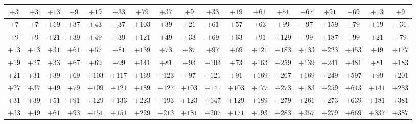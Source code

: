 \documentclass[10pt, portrait,letterpaper]{article}
\begin{document}
{\begin{center}
\begin{tabular}{|c|c|c|c|c|c|c|c|c|c|c|c|c|c|c|c|c|c|}
		\hline
	$+3$ & $+3$ & $+13$ & $+9$ & $+19$ & $+33$ & $+79$ & $+37$ & $+9$ & $+33$ & $+19$ & $+61$ & $+51$ & $+67$ & $+91$ & $+69$ & $+13$ & $+9$ \\
		\hline
	$+7$ & $+7$ & $+19$ & $+37$ & $+43$ & $+37$ & $+103$ & $+39$ & $+21$ & $+61$ & $+57$ & $+63$ & $+99$ & $+97$ & $+159$ & $+79$ & $+19$ & $+31$ \\
		\hline
	$+9$ & $+9$ & $+21$ & $+39$ & $+49$ & $+39$ & $+121$ & $+49$ & $+33$ & $+69$ & $+63$ & $+91$ & $+129$ & $+99$ & $+187$ & $+99$ & $+21$ & $+79$ \\
		\hline
	$+13$ & $+13$ & $+31$ & $+61$ & $+57$ & $+81$ & $+139$ & $+73$ & $+87$ & $+97$ & $+69$ & $+121$ & $+183$ & $+133$ & $+223$ & $+453$ & $+49$ & $+177$ \\
		\hline
	$+19$ & $+27$ & $+33$ & $+67$ & $+69$ & $+99$ & $+141$ & $+81$ & $+93$ & $+103$ & $+73$ & $+163$ & $+259$ & $+139$ & $+241$ & $+481$ & $+81$ & $+183$ \\
		\hline
	$+21$ & $+31$ & $+39$ & $+69$ & $+103$ & $+117$ & $+169$ & $+123$ & $+97$ & $+121$ & $+91$ & $+169$ & $+267$ & $+169$ & $+249$ & $+597$ & $+99$ & $+201$ \\
		\hline
	$+27$ & $+37$ & $+49$ & $+79$ & $+109$ & $+121$ & $+189$ & $+127$ & $+103$ & $+141$ & $+103$ & $+177$ & $+273$ & $+183$ & $+259$ & $+613$ & $+141$ & $+283$ \\
		\hline
	$+31$ & $+39$ & $+51$ & $+91$ & $+129$ & $+133$ & $+223$ & $+193$ & $+123$ & $+147$ & $+129$ & $+189$ & $+279$ & $+261$ & $+273$ & $+639$ & $+181$ & $+381$ \\
		\hline
	$+33$ & $+49$ & $+61$ & $+93$ & $+151$ & $+151$ & $+229$ & $+213$ & $+181$ & $+207$ & $+171$ & $+193$ & $+283$ & $+357$ & $+279$ & $+669$ & $+337$ & $+387$ \\
		\hline
\end{tabular}
\end{center}
}
\end{document}
